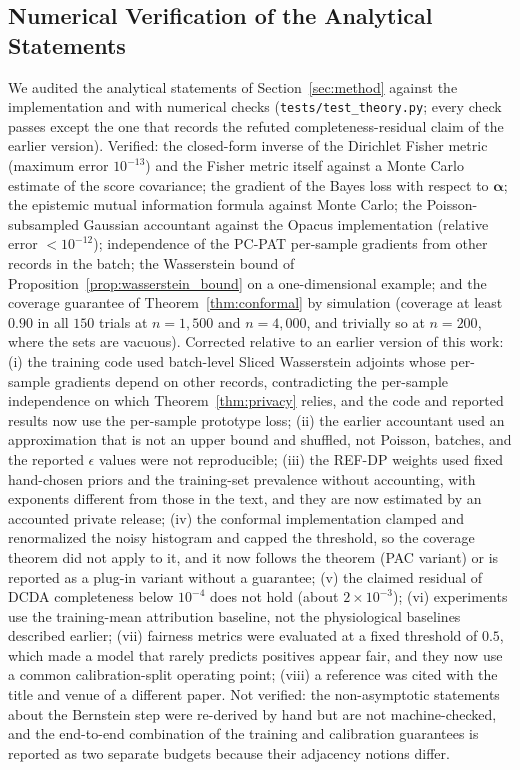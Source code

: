 \documentclass[3p,12pt]{elsarticle}
\theoremstyle{plain}
\theoremstyle{definition}
\begin{document}
\subsection{Numerical Verification of the Analytical Statements}
\label{sec:verification}
We audited the analytical statements of Section~\ref{sec:method} against the implementation and with numerical checks (\texttt{tests/test\_theory.py}; every check passes except the one that records the refuted completeness-residual claim of the earlier version). Verified: the closed-form inverse of the Dirichlet Fisher metric (maximum error $10^{-13}$) and the Fisher metric itself against a Monte Carlo estimate of the score covariance; the gradient of the Bayes loss with respect to $\boldsymbol{\alpha}$; the epistemic mutual information formula against Monte Carlo; the Poisson-subsampled Gaussian accountant against the Opacus implementation (relative error $<10^{-12}$); independence of the PC-PAT per-sample gradients from other records in the batch; the Wasserstein bound of Proposition~\ref{prop:wasserstein_bound} on a one-dimensional example; and the coverage guarantee of Theorem~\ref{thm:conformal} by simulation (coverage at least $0.90$ in all $150$ trials at $n=1{,}500$ and $n=4{,}000$, and trivially so at $n=200$, where the sets are vacuous). Corrected relative to an earlier version of this work: (i) the training code used batch-level Sliced Wasserstein adjoints whose per-sample gradients depend on other records, contradicting the per-sample independence on which Theorem~\ref{thm:privacy} relies, and the code and reported results now use the per-sample prototype loss; (ii) the earlier accountant used an approximation that is not an upper bound and shuffled, not Poisson, batches, and the reported $\epsilon$ values were not reproducible; (iii) the REF-DP weights used fixed hand-chosen priors and the training-set prevalence without accounting, with exponents different from those in the text, and they are now estimated by an accounted private release; (iv) the conformal implementation clamped and renormalized the noisy histogram and capped the threshold, so the coverage theorem did not apply to it, and it now follows the theorem (PAC variant) or is reported as a plug-in variant without a guarantee; (v) the claimed residual of DCDA completeness below $10^{-4}$ does not hold (about $2\times 10^{-3}$); (vi) experiments use the training-mean attribution baseline, not the physiological baselines described earlier; (vii) fairness metrics were evaluated at a fixed threshold of $0.5$, which made a model that rarely predicts positives appear fair, and they now use a common calibration-split operating point; (viii) a reference was cited with the title and venue of a different paper. Not verified: the non-asymptotic statements about the Bernstein step were re-derived by hand but are not machine-checked, and the end-to-end combination of the training and calibration guarantees is reported as two separate budgets because their adjacency notions differ.
\end{document}
